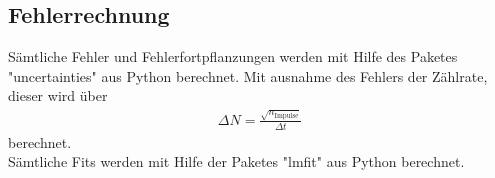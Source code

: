 \subsection{Fehlerrechnung}
Sämtliche Fehler und Fehlerfortpflanzungen werden mit Hilfe des Paketes "uncertainties" \cite{uncertainties} aus Python berechnet. Mit ausnahme des Fehlers der Zählrate, dieser wird über
\begin{align*}
	\Delta N = \frac{\sqrt{n_\text{Impulse}}}{\Delta t}
\end{align*}
berechnet. \\
Sämtliche Fits werden mit Hilfe der Paketes "lmfit" \cite{lmfit} aus Python berechnet.
